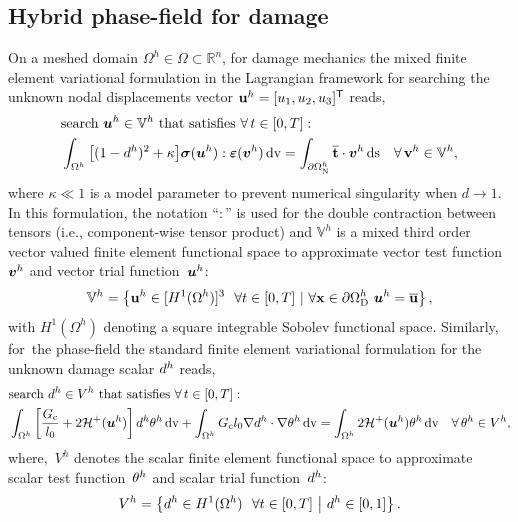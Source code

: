 \subsection{Hybrid phase-field for damage}
On a meshed domain $\Omega^h\in\Omega\subset\mathbb{R}^n$, for damage mechanics the mixed finite element variational formulation in the Lagrangian framework for searching the unknown nodal displacements vector ${\bf{u}}^h=[u_1,u_2,u_3]^\mathsf{T}$ reads,
%
%
\begin{equation}\label{Eq:VarfU}
\begin{aligned}
&\text{search}~\boldsymbol u^h\in\mathbb{V}^h \text{~that satisfies}~\forall\, t\in[0,T]:\\
&\int_{\Omega^h}\big[(1-d^h)^2 + \kappa \big]\boldsymbol{\sigma}(\boldsymbol u^h) : \boldsymbol{\varepsilon}(\boldsymbol v^h) \,\mathrm{d}\text{v}= \int_{\partial\Omega^h_\text{N}} \overline{{\bf t}}\cdot\boldsymbol v^h \,\mathrm{d}\text{s} \quad\forall\,{\bf{v}}^h\in\mathbb{V}^h,
\end{aligned}
\end{equation}
where $\kappa\ll1$ is a model parameter to prevent numerical singularity when $d \to 1$.
In this formulation, the notation ``$:$'' is used for the double contraction between tensors (i.e., component-wise tensor product) and $ \mathbb{V}^h $ is a  mixed third order vector valued finite element functional space to approximate vector test function~$\boldsymbol v^h$ and vector trial function~$\boldsymbol u^h$:
\begin{equation}
\mathbb{V}^h=\left\{ {\bf{u}}^h\in [ {H}^1(\Omega^h) ]^3~~\forall t\in[0,T]~|~ \forall {\bf{x}}\in\partial\Omega^h_{\text{D}}~\boldsymbol u^h=\overline{{\bf{u}}}\right\},
\end{equation}
%
with ${H}^1(\Omega^h)$ denoting a square integrable Sobolev functional space.
Similarly, for~the phase-field the standard finite element variational formulation for the unknown damage scalar $d^h$ reads, 
%
%
\begin{equation}
\begin{aligned}\label{Eq:VarfPhi}
&\text{search}~d^h\in{{V}}^h \text{~that satisfies}~\forall\, t\in[0,T]:\\
&\int_{\Omega^h}\left[ \frac{G_{\text{c}}}{l_0} + 2 \mathcal{H}^{+}(\boldsymbol u^h) \right]d^h\theta^h\, \mathrm{d}\text{v} + \int_{\Omega^h} {G_{\text{c}}}{l_0}\nabla d^h \cdot \nabla\theta^h \, \mathrm{d}\text{v}= \int_{\Omega^h} 2\mathcal{H}^{+}(\boldsymbol u^h)\theta^h \, \mathrm{d}\text{v}\quad\forall\,\theta^h\in{{V}}^h, 
\end{aligned}
\end{equation}
%
%
where,~${{V}}^h$ denotes the scalar finite element functional space to approximate scalar test function~$\theta^h$ and scalar trial function~$d^h$:
\begin{equation}
{{V}}^h=\left\{d^h \in  {H}^1(\Omega^h)~~\forall t\in[0,T]~\middle|~d^h\in[0,1]  \right\}.
\end{equation}


